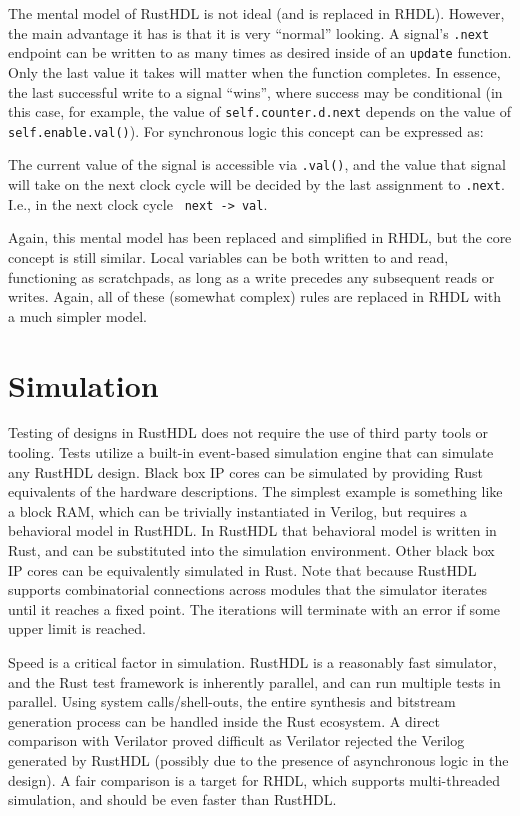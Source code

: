 \documentclass[sigplan,screen,sigconf]{acmart}
\begin{document}
The mental model of RustHDL is not ideal (and is replaced in RHDL).  However, the main advantage it has is that it is very ``normal'' looking.  A signal's \verb|.next| endpoint can be written to as many times as desired inside of an \verb|update| function.  Only the last value it takes will matter when the function completes.  In essence, the last successful write to a signal ``wins'', where success may be conditional (in this case, for example, the value of \verb|self.counter.d.next| depends on the value of 
\verb|self.enable.val()|).  For synchronous logic this concept can be expressed as:

\begin{tcolorbox}
The current value of the signal is accessible via \verb|.val()|, and the value that 
signal will take on the next clock cycle will be decided by the last assignment
to \verb|.next|.  I.e., in the next clock cycle \verb| next -> val|.
\end{tcolorbox}

Again, this mental model has been replaced and simplified in RHDL, but the 
core concept is still similar. Local variables can be both written to and read, 
functioning as scratchpads, as long as a write precedes any subsequent reads or writes.  Again, all of these (somewhat complex) rules are replaced in RHDL with a much simpler model.


\section{Simulation}
Testing of designs in RustHDL does not require the use of third party tools or tooling.  
Tests utilize a built-in event-based simulation engine that can simulate any RustHDL design. Black box IP cores can be simulated by providing Rust equivalents of the hardware descriptions. The simplest example is something like a block RAM, which can be trivially instantiated in Verilog, but requires a behavioral model in RustHDL.  In RustHDL that behavioral model is written in Rust, and can be substituted into the simulation environment.  Other black box IP cores can be equivalently simulated in Rust.  Note that because RustHDL supports combinatorial connections across modules that the simulator iterates until it reaches a fixed point.  The iterations will terminate with an error if some upper limit is reached.

Speed is a critical factor in simulation.  RustHDL is a reasonably fast simulator, 
and the Rust test framework is inherently parallel, and can run multiple tests in parallel. Using system calls/shell-outs, the entire synthesis and bitstream generation process can be handled inside the Rust ecosystem.  A direct comparison with Verilator proved difficult as Verilator rejected the Verilog generated by RustHDL (possibly due to the presence of asynchronous logic in the design).  A fair comparison is a target for RHDL, which supports multi-threaded simulation, and should be even faster than RustHDL.
\end{document}
